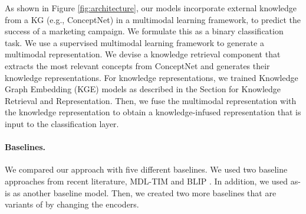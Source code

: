 
As shown in Figure \ref{fig:architecture}, our models incorporate external knowledge from a KG (e.g., ConceptNet) in a multimodal learning framework, to predict the success of a marketing campaign. We formulate this 
as a binary classification task. We use a supervised multimodal learning framework \cite{kiela2020supervised} to generate a multimodal representation. We devise a knowledge retrieval component that extracts the most relevant concepts from ConceptNet and generates their knowledge representations. For knowledge representations, we trained Knowledge Graph Embedding (KGE) models as described in the Section for Knowledge Retrieval and Representation. Then, we fuse the multimodal representation with the knowledge representation to obtain a knowledge-infused representation that is input to the classification layer. 

\paragraph{Baselines.} We compared our approach with five different 
baselines. We used two baseline approaches from recent literature, MDL-TIM \cite{cheng2019success} and BLIP \cite{Li2022-ni}. In addition, we used \cite{kiela2020supervised} as-is as another baseline model. Then, we created two more baselines that are variants of \cite{kiela2020supervised} by changing the encoders. 



